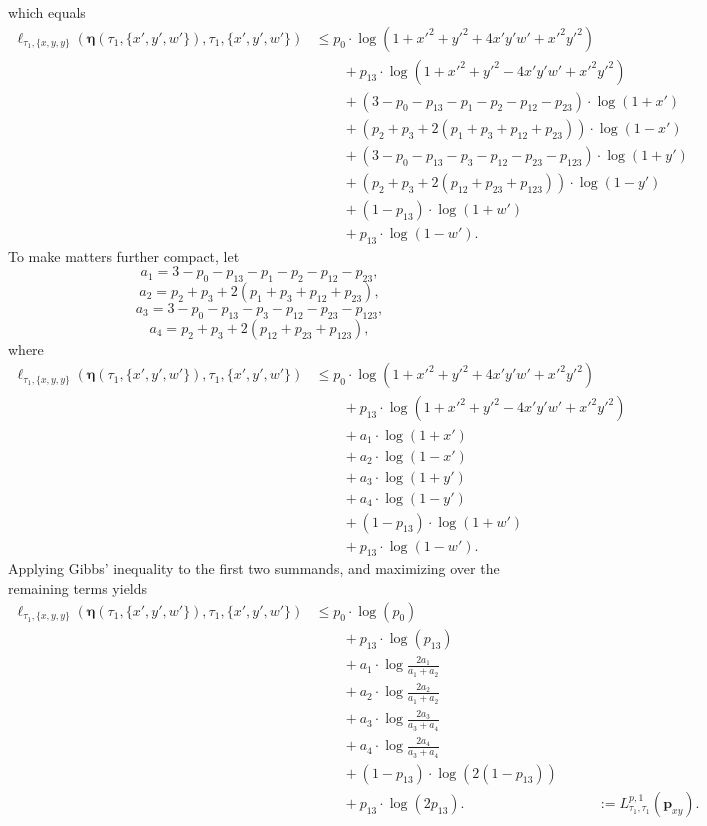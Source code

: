 \documentclass[a4paper]{article}
\newcommand{\fullAncestralSplitPartitions}{\boldsymbol\eta}
\begin{document}
which equals
\begin{align*}
    \ell_{\tau_1,\{x,y,y\}}(\fullAncestralSplitPartitions(\tau_1,\{x',y',w'\}),\tau_1,\{x',y',w'\})
    &\le      p_{0}  \cdot\log(1+x'^2+y'^2+4x'y'w'+x'^2y'^2) \\
    &\qquad + p_{13} \cdot\log(1+x'^2+y'^2-4x'y'w'+x'^2y'^2) \\
    &\qquad + (3-p_{0}-p_{13}-p_{1}-p_{2}-p_{12}-p_{23})\cdot\log(1+x') \\
    &\qquad + (p_{2}+p_{3}+2(p_{1}+p_{3}+p_{12}+p_{23}))\cdot\log(1-x') \\
    &\qquad + (3-p_{0}-p_{13}-p_{3}-p_{12}-p_{23}-p_{123})\cdot\log(1+y') \\
    &\qquad + (p_{2}+p_{3}+2(p_{12}+p_{23}+p_{123}))\cdot\log(1-y') \\
    &\qquad + (1-p_{13})\cdot\log(1+w') \\
    &\qquad + p_{13}\cdot\log(1-w').
\end{align*}
To make matters further compact, let
$$
a_{1} = 3-p_{0}-p_{13}-p_{1}-p_{2}-p_{12}-p_{23},
$$
$$
a_{2} = p_{2}+p_{3}+2(p_{1}+p_{3}+p_{12}+p_{23}),
$$
$$
a_{3} = 3-p_{0}-p_{13}-p_{3}-p_{12}-p_{23}-p_{123},
$$
$$
a_{4} = p_{2}+p_{3}+2(p_{12}+p_{23}+p_{123}),
$$
where
\begin{align*}
    \ell_{\tau_1,\{x,y,y\}}(\fullAncestralSplitPartitions(\tau_1,\{x',y',w'\}),\tau_1,\{x',y',w'\})
    &\le      p_{0}  \cdot\log(1+x'^2+y'^2+4x'y'w'+x'^2y'^2) \\
    &\qquad + p_{13} \cdot\log(1+x'^2+y'^2-4x'y'w'+x'^2y'^2) \\
    &\qquad + a_{1}\cdot\log(1+x') \\
    &\qquad + a_{2}\cdot\log(1-x') \\
    &\qquad + a_{3}\cdot\log(1+y') \\
    &\qquad + a_{4}\cdot\log(1-y') \\
    &\qquad + (1-p_{13})\cdot\log(1+w') \\
    &\qquad + p_{13}\cdot\log(1-w').
\end{align*}
Applying Gibbs' inequality to the first two summands, and maximizing over the remaining terms yields
\begin{align*}
    \ell_{\tau_1,\{x,y,y\}}(\fullAncestralSplitPartitions(\tau_1,\{x',y',w'\}),\tau_1,\{x',y',w'\})
    &\le      p_{0}  \cdot\log(p_{0}) \\
    &\qquad + p_{13} \cdot\log(p_{13}) \\
    &\qquad + a_{1}\cdot\log\frac{2a_{1}}{a_{1}+a_{2}} \\
    &\qquad + a_{2}\cdot\log\frac{2a_{2}}{a_{1}+a_{2}} \\
    &\qquad + a_{3}\cdot\log\frac{2a_{3}}{a_{3}+a_{4}} \\
    &\qquad + a_{4}\cdot\log\frac{2a_{4}}{a_{3}+a_{4}} \\
    &\qquad + (1-p_{13})\cdot\log(2(1-p_{13})) \\
    &\qquad + p_{13}\cdot\log(2p_{13}).
    &\qquad := L^{p,1}_{\tau_1,\tau_1}(\mathbf{p}_{xy}).
\end{align*}
\end{document}
